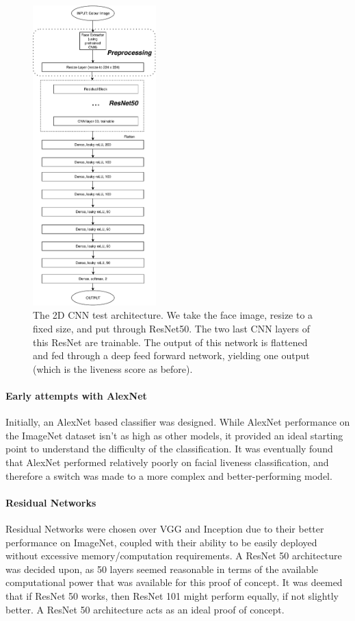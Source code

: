 \documentclass[10pt,a4paper]{article}
\begin{document}
                \begin{figure}
                    \centering
                    \includegraphics[width=180px]{2DCNNArchitecture.pdf}
                    \caption{The 2D CNN test architecture. We take the face image, resize to a fixed size, and put through ResNet50. The two last CNN layers
                    of this ResNet are trainable. The output of this network is flattened and fed through a deep feed forward network, yielding one output (which is the
                    liveness score as before).}
                    \label{2DCNNArchitecture}
                \end{figure}


                \paragraph{Early attempts with AlexNet}
                Initially, an AlexNet based classifier was designed. While AlexNet performance on the ImageNet dataset isn't as high as other models, it provided an ideal starting point to understand the difficulty of the classification. It was eventually found that AlexNet performed relatively poorly on facial liveness classification, and therefore a switch was made to a more complex and better-performing model.

                \paragraph{Residual Networks}
                Residual Networks were chosen over VGG and Inception due to their better performance on ImageNet, coupled with their ability to be easily deployed without excessive memory/computation requirements.
                A ResNet 50 architecture was decided upon, as 50 layers seemed reasonable in terms of the available computational power that was available for this proof of concept. It was deemed that if ResNet 50 works, then ResNet 101 might perform equally, if not slightly better. A ResNet 50 architecture acts as an ideal proof of concept.
\end{document}
